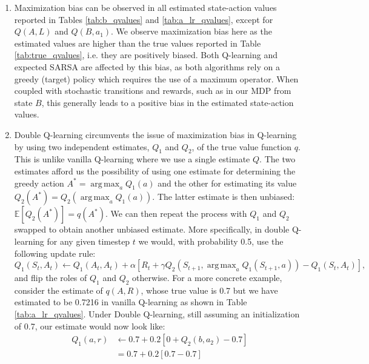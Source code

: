 \documentclass{article}
\DeclareMathOperator*{\argmax}{arg\,max}
\begin{document}
\begin{enumerate}
\begin{table}[ht]
\begin{tabular}{@{}cccccc@{}}
		      \end{tabular}
	      \end{table}
	\item Maximization bias can be observed in all estimated state-action values reported in Tables
	      \ref{tab:b_qvalues} and \ref{tab:a_lr_qvalues}, except for $Q(A, L)$ and $Q(B, a_1)$. We
	      observe maximization bias here as the estimated values are higher than the true values
	      reported in Table \ref{tab:true_qvalues}, i.e. they are positively biased. Both Q-learning
	      and expected SARSA are affected by this bias, as both algorithms rely on a greedy (target)
	      policy which requires the use of a maximum operator. When coupled with stochastic
	      transitions and rewards, such as in our MDP from state $B$, this generally leads to
	      a positive bias in the estimated state-action values.
	\item Double Q-learning circumvents the issue of maximization bias in Q-learning by using two
	      independent estimates, $Q_1$ and $Q_2$, of the true value function $q$. This is unlike
	      vanilla Q-learning where we use a single estimate $Q$. The two estimates afford us the
	      possibility of using one estimate for determining the greedy action $A^* = \argmax_aQ_1(a)$
	      and the other for estimating its value $Q_2(A^*) = Q_2(\argmax_aQ_1(a))$. The latter estimate
	      is then unbiased: $\mathbb{E}\left[Q_2(A^*)\right] = q(A^*)$. We can then repeat the process
	      with $Q_1$ and $Q_2$ swapped to obtain another unbiased estimate. More specifically, in
	      double Q-learning for any given timestep $t$ we would, with probability 0.5, use the
	      following update rule:
	      \begin{equation}
		      Q_1(S_t, A_t) \leftarrow Q_1(A_t, A_t) + \alpha \left[ R_t + \gamma Q_2(S_{t+1},
			      \argmax_{a}Q_1(S_{t+1}, a)) - Q_1(S_t, A_t) \right],
	      \end{equation}
	      and flip the roles of $Q_1$ and $Q_2$ otherwise. For a more concrete example, consider the
	      estimate of $q(A, R)$, whose true value is 0.7 but we have estimated to be 0.7216 in
	      vanilla Q-learning as shown in Table \ref{tab:a_lr_qvalues}. Under Double Q-learning, still
	      assuming an initialization of 0.7, our estimate would now look like:
	      \begin{align*}
		      Q_1(a, r) & \leftarrow 0.7 + 0.2 \left[ 0 + Q_2(b, a_2) - 0.7\right] \\
		                & = 0.7 + 0.2 \left[ 0.7 - 0.7\right]                      \\

\end{align*}
\end{enumerate}
\end{document}
